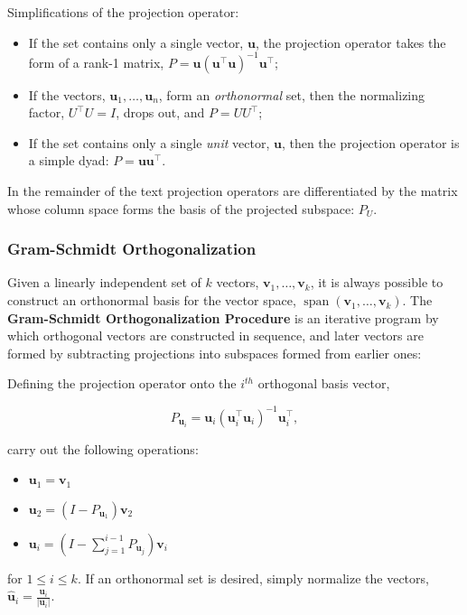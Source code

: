 \documentclass[12pt, twoside, draft]{article}
\begin{document}
Simplifications of the projection operator:
\begin{itemize}[noitemsep]
\item If the set contains only a single vector, $\mathbf{u}$, the projection operator takes the form of a rank-1 matrix, $P =  \mathbf{u}(\mathbf{u}^\top \mathbf{u})^{-1} \mathbf{u}^\top$;
\item If the vectors, $\mathbf{u}_1, \ldots, \mathbf{u}_n$, form an \textit{orthonormal} set, then the normalizing factor, $U^\top U = I$, drops out, and $P = UU^\top$;
\item If the set contains only a single \textit{unit} vector, $\mathbf{u}$, then the projection operator is a simple dyad: $P = \mathbf{u}\mathbf{u}^\top$.
\end{itemize}

In the remainder of the text projection operators are differentiated by the matrix whose column space forms the basis of the projected subspace: $P_U$.

\subsubsection{Gram-Schmidt Orthogonalization}\label{sec:gram-schmidt-orthogonalization}
Given a linearly independent set of $k$ vectors, $\mathbf{v}_1, \ldots, \mathbf{v}_k$, it is always possible to construct an orthonormal basis for the vector space, $\operatorname{span}(\mathbf{v}_1, \ldots, \mathbf{v}_k)$.  The \textbf{Gram-Schmidt Orthogonalization Procedure} is an iterative program by which orthogonal vectors are constructed in sequence, and later vectors are formed by subtracting projections into subspaces formed from earlier ones:

Defining the projection operator onto the $i^{th}$ orthogonal basis vector, 

\begin{equation}\label{eq:Gram_Schmidt_projection_operator}
P_{\mathbf{u}_i} = \mathbf{u}_i \left( \mathbf{u}_i^\top \mathbf{u}_i \right)^{-1} \mathbf{u}_i^\top,
\end{equation}

carry out the following operations:
\begin{itemize}[noitemsep]
\item $\mathbf{u}_1 = \mathbf{v}_1$
\item $\mathbf{u}_2 = \left( I - P_{\mathbf{u}_1} \right) \mathbf{v}_2$
\item $\mathbf{u}_i = \left( I - \sum_{j=1}^{i-1} P_{\mathbf{u}_j} \right) \mathbf{v}_i$
\end{itemize}
for $1 \leq i \leq k$.  If an orthonormal set is desired, simply normalize the vectors, $\hat{\mathbf{u}}_i = \frac{\mathbf{u}_i}{|\mathbf{u}_i|} $.
\end{document}
